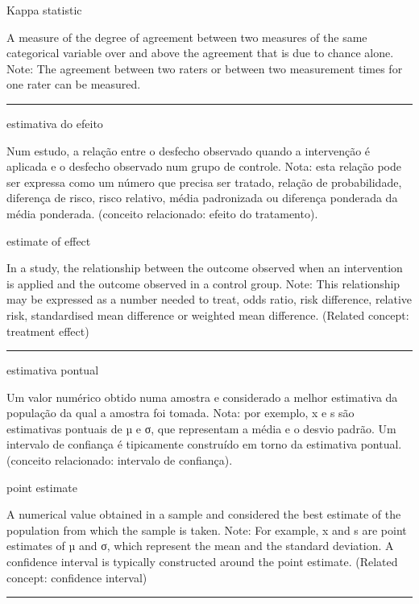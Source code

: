 \documentclass[
]{book}
\begin{document}
Kappa statistic

A measure of the degree of agreement between two measures of the same categorical variable over and above the agreement that is due to chance alone. Note: The agreement between two raters or between two measurement times for one rater can be measured.

\begin{center}\rule{0.5\linewidth}{0.5pt}\end{center}

estimativa do efeito

Num estudo, a relação entre o desfecho observado quando a intervenção é aplicada e o desfecho observado num grupo de controle. Nota: esta relação pode ser expressa como um número que precisa ser tratado, relação de probabilidade, diferença de risco, risco relativo, média padronizada ou diferença ponderada da média ponderada. (conceito relacionado: efeito do tratamento).

estimate of effect

In a study, the relationship between the outcome observed when an intervention is applied and the outcome observed in a control group. Note: This relationship may be expressed as a number needed to treat, odds ratio, risk difference, relative risk, standardised mean difference or weighted mean difference. (Related concept: treatment effect)

\begin{center}\rule{0.5\linewidth}{0.5pt}\end{center}

estimativa pontual

Um valor numérico obtido numa amostra e considerado a melhor estimativa da população da qual a amostra foi tomada. Nota: por exemplo, x e s são estimativas pontuais de µ e σ, que representam a média e o desvio padrão. Um intervalo de confiança é tipicamente construído em torno da estimativa pontual. (conceito relacionado: intervalo de confiança).

point estimate

A numerical value obtained in a sample and considered the best estimate of the population from which the sample is taken. Note: For example, x and s are point estimates of µ and σ, which represent the mean and the standard deviation. A confidence interval is typically constructed around the point estimate. (Related concept: confidence interval)

\begin{center}\rule{0.5\linewidth}{0.5pt}\end{center}
\end{document}
